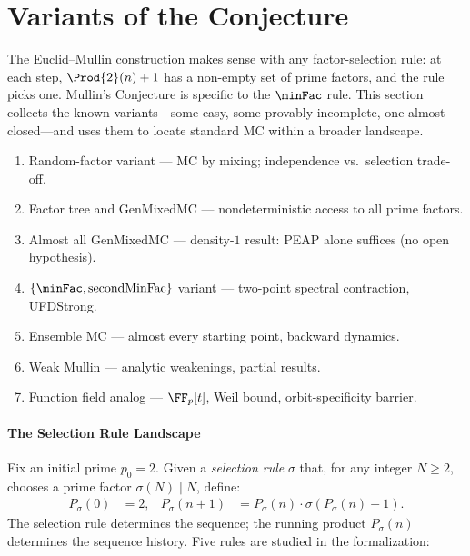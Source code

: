 \section{Variants of the Conjecture}
\label{sec:variants}

The Euclid--Mullin construction makes sense with any factor-selection
rule: at each step, $\Prod{2}(n)+1$ has a non-empty set of prime
factors, and the rule picks one.  Mullin's Conjecture is specific to
the $\minFac$ rule.  This section collects the known variants---some
easy, some provably incomplete, one almost closed---and uses them to
locate standard MC within a broader landscape.

\begin{roadmap}
\begin{enumerate}[nosep,leftmargin=*]
\item[\S\ref{sec:random-variant}] Random-factor variant --- MC by mixing; independence vs.\ selection trade-off.
\item[\S\ref{sec:factor-tree}] Factor tree and GenMixedMC --- nondeterministic access to all prime factors.
\item[\S\ref{sec:almost-all-mixed}] Almost all GenMixedMC --- density-$1$ result: PEAP alone suffices (no open hypothesis).
\item[\S\ref{sec:minfac-secondminfac}] $\{\minFac,\operatorname{secondMinFac}\}$ variant --- two-point spectral contraction, UFDStrong.
\item[\S\ref{sec:ensemble-variant}] Ensemble MC --- almost every starting point, backward dynamics.
\item[\S\ref{sec:weak-mullin}] Weak Mullin --- analytic weakenings, partial results.
\item[\S\ref{sec:function-field}] Function field analog --- $\FF_p[t]$, Weil bound, orbit-specificity barrier.
\end{enumerate}
\end{roadmap}

\paragraph{The Selection Rule Landscape}
\label{sec:selection-landscape}

Fix an initial prime $p_0 = 2$.  Given a \emph{selection rule}
$\sigma$ that, for any integer $N \geq 2$, chooses a prime factor
$\sigma(N) \mid N$, define:
\begin{align}
  P_\sigma(0) &= 2, &
  P_\sigma(n{+}1) &= P_\sigma(n) \cdot \sigma(P_\sigma(n)+1).
\end{align}
The selection rule determines the sequence; the running product
$P_\sigma(n)$ determines the sequence history.
Five rules are studied in the formalization:

